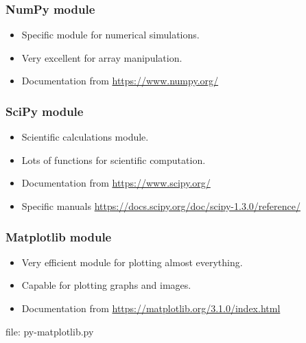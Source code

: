
\begin{frame}[fragile]
\frametitle{NumPy module}

\begin{itemize}
\item Specific module for numerical simulations.
\item Very excellent for array manipulation.
\item Documentation from \url{https://www.numpy.org/}
\end{itemize}

%

\end{frame}


\begin{frame}[fragile]
\frametitle{SciPy module}

\begin{itemize}
\item Scientific calculations module.
\item Lots of functions for scientific computation.
\item Documentation from \url{https://www.scipy.org/}
\item Specific manuals \url{https://docs.scipy.org/doc/scipy-1.3.0/reference/}
\end{itemize}

%

\end{frame}


\begin{frame}[fragile]
\frametitle{Matplotlib module}

\begin{itemize}
\item Very efficient module for plotting almost everything.
\item Capable for plotting graphs and images.
\item Documentation from \url{https://matplotlib.org/3.1.0/index.html}
\end{itemize}

\newcommand{\newfilename}{py-matplotlib.py}

file: \newfilename

\end{frame}

